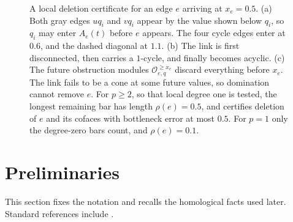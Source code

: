 \documentclass[11pt,letterpaper]{article}
\theoremstyle{definition}
\newcommand{\redH}{\widetilde{\mathrm H}}
\newcommand{\Oc}{\mathcal O}
\begin{document}
\begin{figure}[ht]
{%
}
\caption{A local deletion certificate for an edge $e$ arriving at $x_e=0.5$.
(a) Both gray edges $uq_i$ and $vq_i$ appear by the value shown below $q_i$,
so $q_i$ may enter $A_e(t)$ before $e$ appears. The four cycle edges enter at
$0.6$, and the dashed diagonal at $1.1$. (b) The link is first disconnected,
then carries a $1$-cycle, and finally becomes acyclic. (c) The future
obstruction modules $\Oc_{e,q}^{\geq x_e}$ discard everything before $x_e$.
The link fails to be a cone at some future values, so domination cannot
remove $e$. For $p\geq2$, so that local degree one is tested, the longest
remaining bar has length $\rho(e)=0.5$, and  certifies
deletion of $e$ and its cofaces with bottleneck error at most $0.5$. For
$p=1$ only the degree-zero bars count, and $\rho(e)=0.1$.}
\label{fig:running}
\end{figure}

\section{Preliminaries}\label{sec:preliminaries}
This section fixes the notation and recalls the homological facts used later.
Standard references include
\cite{EdelsbrunnerHarer2010,ZomorodianCarlsson2005}.
\end{document}
